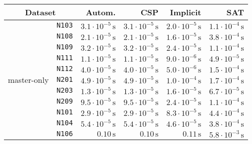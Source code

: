 \begin{tabular}{cc|rrrr}
\multicolumn{2}{|c|}{                 Dataset} &                        Autom. &                           CSP &                      Implicit &                           SAT\\
\hline
\multirow{19}{|c|}{master-only}
 & \texttt{\footnotesize                 N103} & $ 3.1\cdot 10^{-5}\,\text{s}$ & $ 3.1\cdot 10^{-5}\,\text{s}$ & $ 2.0\cdot 10^{-5}\,\text{s}$ & $ 1.1\cdot 10^{-4}\,\text{s}$\\
 & \texttt{\footnotesize                 N108} & $ 2.1\cdot 10^{-5}\,\text{s}$ & $ 2.1\cdot 10^{-5}\,\text{s}$ & $ 1.6\cdot 10^{-5}\,\text{s}$ & $ 3.8\cdot 10^{-4}\,\text{s}$\\
 & \texttt{\footnotesize                 N109} & $ 3.2\cdot 10^{-5}\,\text{s}$ & $ 3.2\cdot 10^{-5}\,\text{s}$ & $ 2.4\cdot 10^{-5}\,\text{s}$ & $ 1.1\cdot 10^{-4}\,\text{s}$\\
 & \texttt{\footnotesize                 N111} & $ 1.1\cdot 10^{-5}\,\text{s}$ & $ 1.1\cdot 10^{-5}\,\text{s}$ & $ 9.0\cdot 10^{-6}\,\text{s}$ & $ 4.9\cdot 10^{-5}\,\text{s}$\\
 & \texttt{\footnotesize                 N112} & $ 4.0\cdot 10^{-5}\,\text{s}$ & $ 4.0\cdot 10^{-5}\,\text{s}$ & $ 5.0\cdot 10^{-6}\,\text{s}$ & $ 1.5\cdot 10^{-4}\,\text{s}$\\
 & \texttt{\footnotesize                 N201} & $ 4.9\cdot 10^{-5}\,\text{s}$ & $ 4.9\cdot 10^{-5}\,\text{s}$ & $ 1.0\cdot 10^{-4}\,\text{s}$ & $ 1.7\cdot 10^{-4}\,\text{s}$\\
 & \texttt{\footnotesize                 N203} & $ 1.3\cdot 10^{-5}\,\text{s}$ & $ 1.3\cdot 10^{-5}\,\text{s}$ & $ 1.6\cdot 10^{-5}\,\text{s}$ & $ 6.7\cdot 10^{-5}\,\text{s}$\\
 & \texttt{\footnotesize                 N209} & $ 9.5\cdot 10^{-5}\,\text{s}$ & $ 9.5\cdot 10^{-5}\,\text{s}$ & $ 2.4\cdot 10^{-5}\,\text{s}$ & $ 1.1\cdot 10^{-4}\,\text{s}$\\
 & \texttt{\footnotesize                 N101} & $ 2.9\cdot 10^{-5}\,\text{s}$ & $ 2.9\cdot 10^{-5}\,\text{s}$ & $ 8.3\cdot 10^{-5}\,\text{s}$ & $ 4.4\cdot 10^{-4}\,\text{s}$\\
 & \texttt{\footnotesize                 N104} & $ 5.4\cdot 10^{-5}\,\text{s}$ & $ 5.4\cdot 10^{-5}\,\text{s}$ & $ 4.6\cdot 10^{-5}\,\text{s}$ & $ 3.8\cdot 10^{-4}\,\text{s}$\\
 & \texttt{\footnotesize                 N106} & $             0.10\,\text{s}$ & $             0.10\,\text{s}$ & $             0.11\,\text{s}$ & $ 5.8\cdot 10^{-3}\,\text{s}$\\

\end{tabular}
